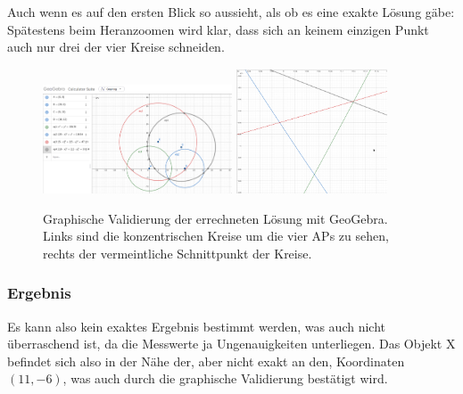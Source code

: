 Auch wenn es auf den ersten Blick so aussieht, als ob es eine exakte Lösung gäbe: Spätestens beim Heranzoomen wird klar, dass sich an keinem einzigen Punkt auch nur drei der vier Kreise schneiden.

\begin{figure}[H]
    \centering
    \includegraphics[width=0.5\textwidth]{figures/geogebra/screen_2.png}
    \includegraphics[width=0.4\textwidth]{figures/geogebra/screen_3.png}
    \caption{Graphische Validierung der errechneten Lösung mit GeoGebra. Links sind die konzentrischen Kreise um die vier APs zu sehen, rechts der vermeintliche Schnittpunkt der Kreise.}
    \label{geogebra}
\end{figure}

\subsubsection*{Ergebnis}

Es kann also kein exaktes Ergebnis bestimmt werden, was auch nicht überraschend ist, da die Messwerte ja Ungenauigkeiten unterliegen.
Das Objekt X befindet sich also in der Nähe der, aber nicht exakt an den, Koordinaten $(11, -6)$, was auch durch die graphische Validierung bestätigt wird.
